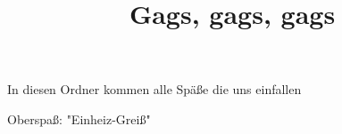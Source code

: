 ﻿\documentclass{article}
\title{Gags, gags, gags}
\begin{document}
\maketitle

In diesen Ordner kommen alle Späße die uns einfallen

Oberspaß: "Einheiz-Greiß"
\end{document}
